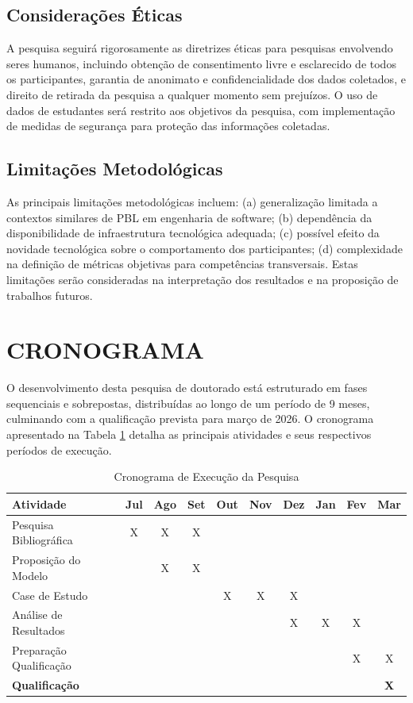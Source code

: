 \documentclass[12pt, a4paper, oneside, brazilian]{abntex2}
\begin{document}
\subsection{Considerações Éticas}

A pesquisa seguirá rigorosamente as diretrizes éticas para pesquisas envolvendo seres humanos, incluindo obtenção de consentimento livre e esclarecido de todos os participantes, garantia de anonimato e confidencialidade dos dados coletados, e direito de retirada da pesquisa a qualquer momento sem prejuízos. O uso de dados de estudantes será restrito aos objetivos da pesquisa, com implementação de medidas de segurança para proteção das informações coletadas.

\subsection{Limitações Metodológicas}

As principais limitações metodológicas incluem: (a) generalização limitada a contextos similares de PBL em engenharia de software; (b) dependência da disponibilidade de infraestrutura tecnológica adequada; (c) possível efeito da novidade tecnológica sobre o comportamento dos participantes; (d) complexidade na definição de métricas objetivas para competências transversais. Estas limitações serão consideradas na interpretação dos resultados e na proposição de trabalhos futuros.

\section{CRONOGRAMA}

O desenvolvimento desta pesquisa de doutorado está estruturado em fases sequenciais e sobrepostas, distribuídas ao longo de um período de 9 meses, culminando com a qualificação prevista para março de 2026. O cronograma apresentado na Tabela \ref{tab:cronograma} detalha as principais atividades e seus respectivos períodos de execução.

\begin{table}[htbp]
\centering
\caption{Cronograma de Execução da Pesquisa}
\label{tab:cronograma}
\begin{tabular}{|l|c|c|c|c|c|c|c|c|c|}
\hline
\textbf{Atividade} & \textbf{Jul} & \textbf{Ago} & \textbf{Set} & \textbf{Out} & \textbf{Nov} & \textbf{Dez} & \textbf{Jan} & \textbf{Fev} & \textbf{Mar} \\
\hline
Pesquisa Bibliográfica & X & X & X & & & & & & \\
\hline
Proposição do Modelo & & X & X & & & & & & \\
\hline
Case de Estudo & & & & X & X & X & & & \\
\hline
Análise de Resultados & & & & & & X & X & X & \\
\hline
Preparação Qualificação & & & & & & & & X & X \\
\hline
\textbf{Qualificação} & & & & & & & & & \textbf{X} \\
\hline
\end{tabular}
\end{table}
\end{document}

